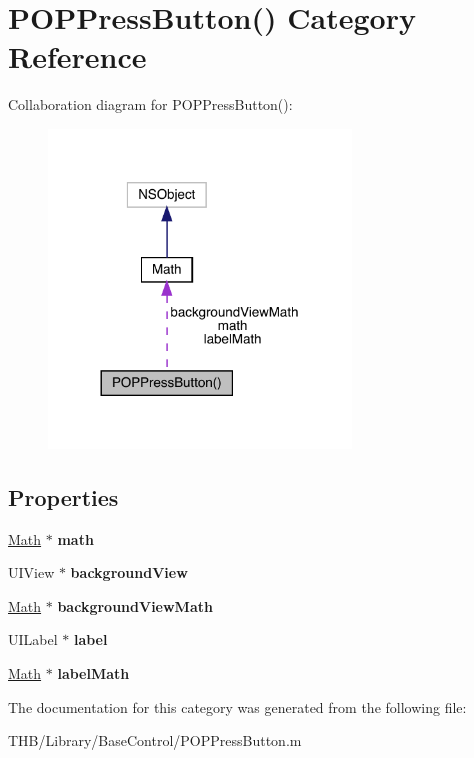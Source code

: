 \hypertarget{category_p_o_p_press_button_07_08}{}\section{P\+O\+P\+Press\+Button() Category Reference}
\label{category_p_o_p_press_button_07_08}


Collaboration diagram for P\+O\+P\+Press\+Button()\+:\nopagebreak
\begin{figure}[H]
\begin{center}
\leavevmode
\includegraphics[width=228pt]{category_p_o_p_press_button_07_08__coll__graph}
\end{center}
\end{figure}
\subsection*{Properties}
\begin{DoxyCompactItemize}
\item 
\mbox{\label{category_p_o_p_press_button_07_08_a0a19c7e732f59d25756ce7f808c7a04d}} 
\mbox{\hyperlink{interface_math}{Math}} $\ast$ {\bfseries math}
\item 
\mbox{\label{category_p_o_p_press_button_07_08_a25638a34da000fa9d40eb4d182d3384c}} 
U\+I\+View $\ast$ {\bfseries background\+View}
\item 
\mbox{\label{category_p_o_p_press_button_07_08_aacf0460a13e09e7f54b28b504d43b0d6}} 
\mbox{\hyperlink{interface_math}{Math}} $\ast$ {\bfseries background\+View\+Math}
\item 
\mbox{\label{category_p_o_p_press_button_07_08_a6e655053f9fd0f6552d993f84dc1709b}} 
U\+I\+Label $\ast$ {\bfseries label}
\item 
\mbox{\label{category_p_o_p_press_button_07_08_a8d9771956b9aa16d6034674d4ba09bb7}} 
\mbox{\hyperlink{interface_math}{Math}} $\ast$ {\bfseries label\+Math}
\end{DoxyCompactItemize}


The documentation for this category was generated from the following file\+:\begin{DoxyCompactItemize}
\item 
T\+H\+B/\+Library/\+Base\+Control/P\+O\+P\+Press\+Button.\+m\end{DoxyCompactItemize}
